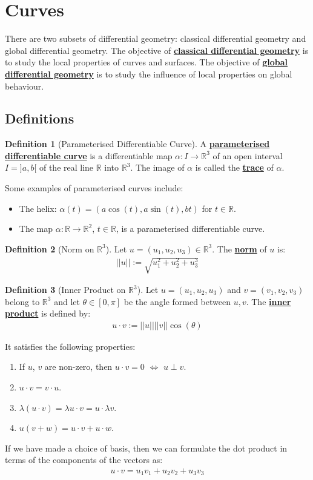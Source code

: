 \documentclass[11pt]{scrartcl}
\newcommand{\R}[0]{\mathbb{R}}
\theoremstyle{definition}
\newtheorem{definition}{Definition}
\theoremstyle{remark}
\newcommand{\dfn}[1]{\textbf{\underline{#1}}}
\begin{document}
\section{Curves}
There are two subsets of differential geometry: classical differential geometry and global differential geometry. The objective of \dfn{classical differential geometry} is to study the local properties of curves and surfaces. The objective of \dfn{global differential geometry} is to study the influence of local properties on global behaviour. 
\subsection{Definitions}

\begin{definition}[Parameterised Differentiable Curve] 
	A \dfn{parameterised differentiable curve} is a differentiable map $ \alpha: I \rightarrow \R^3$ of an open interval $I = ]a,b[$ of the real line $\R$ into $\R^3$. The image of $\alpha$ is called the \dfn{trace} of $\alpha$. 
\end{definition}

Some examples of parameterised curves include: 
\begin{itemize}[noitemsep]
	\item The helix: $\alpha(t) = (a \cos (t), a \sin(t), bt)$ for $t \in \R$. 
	\item The map $\alpha: \R \rightarrow \R^2$, $t \in \R$, is a parameterised differentiable curve. 
\end{itemize}

\begin{definition}[Norm on $\R^3$]
	Let $u = (u_1, u_2, u_3) \in \R^3$. The \dfn{norm} of $u$ is: 
	\begin{align*}
		|| u || := \sqrt{ u_1^2 + u_2^2 + u_3^3} 
	\end{align*}
\end{definition}

\begin{definition}[Inner Product on $\R^3$] 
	Let $u = (u_1, u_2, u_3)$ and $v= (v_1, v_2, v_3)$ belong to $\R^3$ and let $\theta \in [0, \pi]$ be the angle formed between $u,v$. The \dfn{inner product} is defined by: 
	\begin{align}
		u \cdot v := || u || ||v|| \cos (\theta) 	
	\end{align}
\end{definition}
It satisfies the following properties: 
\begin{enumerate}[noitemsep]
	\item If $u$, $v$ are non-zero, then $u \cdot v = 0$ $\iff$ $u \perp v$. 
	\item $u \cdot v = v \cdot u$. 
	\item $\lambda (u \cdot v ) = \lambda u \cdot v =  u \cdot \lambda v$. 
	\item $u ( v + w) = u \cdot v + u \cdot w$. 
\end{enumerate}
If we have made a choice of basis, then we can formulate the dot product in terms of the components of the vectors as: 
\begin{align}
	u \cdot v = u_1 v_1 + u_2 v_2 + u_3 v_3 	
\end{align}
\end{document}
